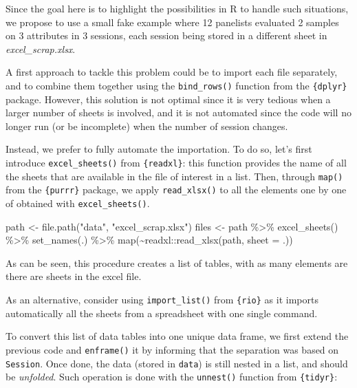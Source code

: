 \documentclass[
]{krantz}
\makeatletter
\newenvironment{Shaded}{\begin{snugshade}}{\end{snugshade}}
\newcommand{\AttributeTok}[1]{\textcolor[rgb]{0.61,0.61,0.61}{#1}}
\newcommand{\FunctionTok}[1]{\textcolor[rgb]{0,0,0}{#1}}
\newcommand{\NormalTok}[1]{#1}
\newcommand{\OtherTok}[1]{\textcolor[rgb]{0.37,0.37,0.37}{#1}}
\newcommand{\SpecialCharTok}[1]{\textcolor[rgb]{0,0,0}{#1}}
\newcommand{\StringTok}[1]{\textcolor[rgb]{0.5,0.5,0.5}{#1}}
\renewenvironment{quote}{\begin{VF}}{\end{VF}}
\newenvironment{kframe}{%
\medskip{}
\setlength{\fboxsep}{.8em}
 \def\at@end@of@kframe{}%
 \ifinner\ifhmode%
  \def\at@end@of@kframe{\end{minipage}}%
  \begin{minipage}{\columnwidth}%
 \fi\fi%
 \def\FrameCommand##1{\hskip\@totalleftmargin \hskip-\fboxsep
 \colorbox{shadecolor}{##1}\hskip-\fboxsep
     \hskip-\linewidth \hskip-\@totalleftmargin \hskip\columnwidth}%
 \MakeFramed {\advance\hsize-\width
   \@totalleftmargin\z@ \linewidth\hsize
   \@setminipage}}%
 {\par\unskip\endMakeFramed%
 \at@end@of@kframe}
\renewenvironment{Shaded}{\begin{kframe}}{\end{kframe}}
\makeatother
\begin{document}
Since the goal here is to highlight the possibilities in R to handle such situations, we propose to use a small fake example where 12 panelists evaluated 2 samples on 3 attributes in 3 sessions, each session being stored in a different sheet in \emph{excel\_scrap.xlsx}.

A first approach to tackle this problem could be to import each file separately, and to combine them together using the \texttt{bind\_rows()} function from the \texttt{\{dplyr\}} package. However, this solution is not optimal since it is very tedious when a larger number of sheets is involved, and it is not automated since the code will no longer run (or be incomplete) when the number of session changes.

Instead, we prefer to fully automate the importation. To do so, let's first introduce \texttt{excel\_sheets()} from \texttt{\{readxl\}}: this function provides the name of all the sheets that are available in the file of interest in a list. Then, through \texttt{map()} from the \texttt{\{purrr\}} package, we apply \texttt{read\_xlsx()} to all the elements one by one of obtained with \texttt{excel\_sheets()}.

\begin{Shaded}
\begin{Highlighting}[]
\NormalTok{path }\OtherTok{\textless{}{-}} \FunctionTok{file.path}\NormalTok{(}\StringTok{"data"}\NormalTok{, }\StringTok{"excel\_scrap.xlsx"}\NormalTok{)}
\NormalTok{files }\OtherTok{\textless{}{-}}\NormalTok{ path }\SpecialCharTok{\%\textgreater{}\%} 
  \FunctionTok{excel\_sheets}\NormalTok{() }\SpecialCharTok{\%\textgreater{}\%} 
  \FunctionTok{set\_names}\NormalTok{(.) }\SpecialCharTok{\%\textgreater{}\%} 
  \FunctionTok{map}\NormalTok{(}\SpecialCharTok{\textasciitilde{}}\NormalTok{readxl}\SpecialCharTok{::}\FunctionTok{read\_xlsx}\NormalTok{(path, }\AttributeTok{sheet =}\NormalTok{ .))}
\end{Highlighting}
\end{Shaded}

As can be seen, this procedure creates a list of tables, with as many elements are there are sheets in the excel file.

\begin{quote}
As an alternative, consider using \texttt{import\_list()} from \texttt{\{rio\}} as it imports automatically all the sheets from a spreadsheet with one single command.
\end{quote}

To convert this list of data tables into one unique data frame, we first extend the previous code and \texttt{enframe()} it by informing that the separation was based on \texttt{Session}. Once done, the data (stored in \texttt{data}) is still nested in a list, and should be \emph{unfolded}. Such operation is done with the \texttt{unnest()} function from \texttt{\{tidyr\}}:
\end{document}
